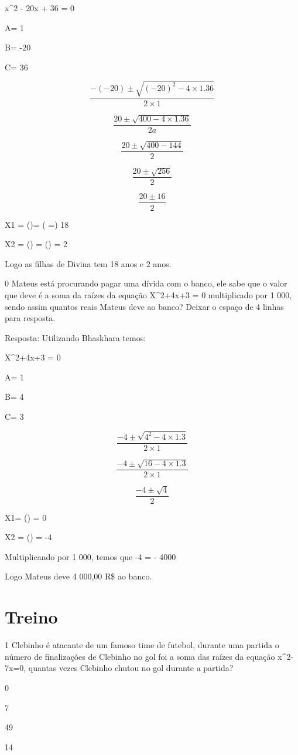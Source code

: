 x^2 - 20x + 36 = 0

A= 1

B= -20

C= 36

\[\frac{- ( - 20) \pm \sqrt{{( - 20)}^{2} - 4\times 1.36}}{2\times 1}\]

\[\frac{20 \pm \sqrt{400 - 4\times 1.36}}{2a}\]

\[\frac{20 \pm \sqrt{400 - 144}}{2}\]

\[\frac{20 \pm \sqrt{256}}{2}\]

\[\frac{20 \pm 16}{2}\]

X1 = ()= ( =) 18

X2 = () = () = 2

Logo as filhas de Divina tem 18 anos e 2 anos.

\num{0} Mateus está procurando pagar uma dívida com o banco, ele sabe que o
valor que deve é a soma da raízes da equação X^2+4x+3 = 0 multiplicado
por 1 000, sendo assim quantos reais Mateus deve ao banco? Deixar o
espaço de 4 linhas para resposta.

Resposta: Utilizando Bhaskhara temos:

X^2+4x+3 = 0

A= 1

B= 4

C= 3

\[\frac{- 4 \pm \sqrt{4^{2} - 4\times 1.3}}{2\times 1}\]

\[\frac{- 4 \pm \sqrt{16 - 4\times 1.3}}{2\times 1}\]

\[\frac{- 4 \pm \sqrt{4}}{2}\]

X1= () = 0

X2 = () = -4

Multiplicando por 1 000, temos que -4 = - 4000

Logo Mateus deve 4 000,00 R\$ ao banco.

\section{Treino}

\num{1} Clebinho é atacante de um famoso time de futebol, durante uma partida
o número de finalizações de Clebinho no gol foi a soma das raízes da
equação x^2- 7x=0, quantas vezes Clebinho chutou no gol durante a
partida?

\item 0
\item 7
\item 49
\item 14

